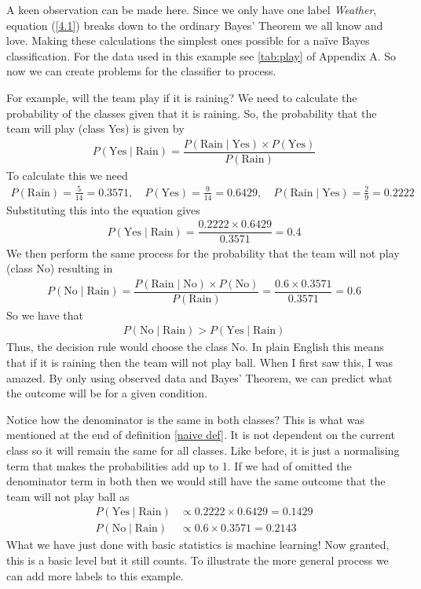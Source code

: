 \documentclass[12pt,twoside]{report}   %
\newcommand{\ti}{\textit}
\begin{document}
A keen observation can be made here. Since we only have one label \ti{Weather}, equation (\ref{4.1}) breaks down to the ordinary Bayes' Theorem we all know and love. Making these calculations the simplest ones possible for a na\"{i}ve Bayes classification. For the data used in this example see \ref{tab:play} of Appendix A. So now we can create problems for the classifier to process.

For example, will the team play if it is raining? We need to calculate the probability of the classes given that it is raining. So, the probability that the team will play (class Yes) is given by
\begin{align*}
P(\text{Yes}\mid\text{Rain}) = \dfrac{P(\text{Rain}\mid \text{Yes})\times P(\text{Yes})}{P(\text{Rain})}
\end{align*}
To calculate this we need
\begin{align*}
P(\text{Rain}) = \frac{5}{14} = 0.3571,\quad P(\text{Yes}) = \frac{9}{14} = 0.6429,\quad P(\text{Rain}\mid \text{Yes}) = \frac{2}{9} = 0.2222
\end{align*}
Substituting this into the equation gives
\begin{align*}
P(\text{Yes}\mid\text{Rain}) = \dfrac{0.2222\times 0.6429}{0.3571} = 0.4
\end{align*}
We then perform the same process for the probability that the team will not play (class No) resulting in
\begin{align*}
P(\text{No}\mid\text{Rain}) = \dfrac{P(\text{Rain}\mid \text{No})\times P(\text{No})}{P(\text{Rain})} = \dfrac{0.6\times 0.3571}{0.3571} = 0.6
\end{align*}
So we have that
\begin{align*}
P(\text{No}\mid\text{Rain}) > P(\text{Yes}\mid\text{Rain})
\end{align*}
Thus, the decision rule would choose the class No. In plain English this means that if it is raining then the team will not play ball. When I first saw this, I was amazed. By only using observed data and Bayes' Theorem, we can predict what the outcome will be for a given condition.

Notice how the denominator is the same in both classes? This is what was mentioned at the end of definition \ref{naive def}. It is not dependent on the current class so it will remain the same for all classes. Like before, it is just a normalising term that makes the probabilities add up to 1. If we had of omitted the denominator term in both then we would still have the same outcome that the team will not play ball as
\begin{align*}
P(\text{Yes}\mid\text{Rain}) &\propto 0.2222\times 0.6429 = 0.1429\\
P(\text{No}\mid\text{Rain}) &\propto 0.6\times 0.3571 = 0.2143
\end{align*}
What we have just done with basic statistics is machine learning! Now granted, this is a basic level but it still counts. To illustrate the more general process we can add more labels to this example.
\end{document}
